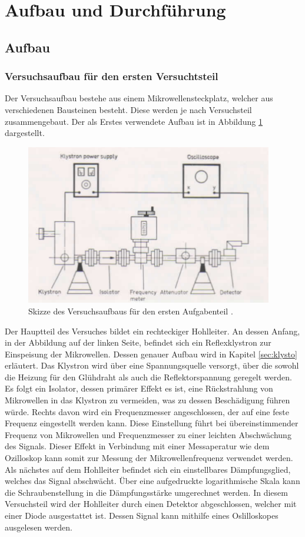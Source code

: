 \section{Aufbau und Durchführung}
\subsection{Aufbau}
\label{sec:Aufbau}

\subsubsection{Versuchsaufbau für den ersten Versuchtsteil}
\label{sec:aufbau1}

Der Versuchsaufbau bestehe aus einem Mikrowellensteckplatz, welcher aus verschiedenen Bausteinen besteht.
Diese werden je nach Versuchsteil zusammengebaut.
Der als Erstes verwendete Aufbau ist in Abbildung \ref{fig:aufbau1} dargestellt.

\begin{figure}
  \centering
  \includegraphics[height=7cm]{ressources/aufbau1.png}
  \caption{Skizze des Versuchsaufbaus für den ersten Aufgabenteil \cite{skript}.}
  \label{fig:aufbau1}
\end{figure}

Der Hauptteil des Versuches bildet ein rechteckiger Hohlleiter.
An dessen Anfang, in der Abbildung auf der linken Seite, befindet sich ein Reflexklystron zur Einspeisung der Mikrowellen.
Dessen genauer Aufbau wird in Kapitel \ref{sec:klysto} erläutert.
Das Klystron wird über eine Spannungsquelle versorgt, über die sowohl die Heizung für den Glühdraht als auch die Reflektorspannung geregelt werden.
Es folgt ein Isolator, dessen primärer Effekt es ist, eine Rückstrahlung von Mikrowellen in das Klystron zu vermeiden, was zu dessen Beschädigung führen würde.
Rechts davon wird ein Frequenzmesser angeschlossen, der auf eine feste Frequenz eingestellt werden kann.
Diese Einstellung führt bei übereinstimmender Frequenz von Mikrowellen und Frequenzmesser zu einer leichten Abschwächung des Signals.
Dieser Effekt in Verbindung mit einer Messaperatur wie dem Ozilloskop kann somit zur Messung der Mikrowellenfrequenz verwendet werden.
Als nächstes auf dem Hohlleiter befindet sich ein einstellbares Dämpfungsglied, welches das Signal abschwächt.
Über eine aufgedruckte logarithmische Skala kann die Schraubenstellung in die Dämpfungsstärke umgerechnet werden.
In diesem Versuchsteil wird der Hohlleiter durch einen Detektor abgeschlossen, welcher mit einer Diode ausgestattet ist.
Dessen Signal kann mithilfe eines Oslilloskopes ausgelesen werden.


